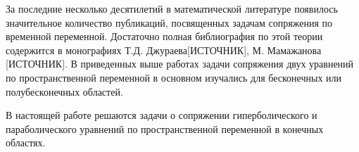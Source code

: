 За последние несколько десятилетий в математической литературе появилось значительное количество публикаций, посвященных задачам сопряжения по временной переменной. Достаточно полная библиография по этой теории содержится в монографиях Т.Д. Джураева[ИСТОЧНИК], М. Мамажанова [ИСТОЧНИК]. В приведенных выше работах задачи сопряжения двух уравнений по пространственной переменной в основном изучались для бесконечных или полубесконечных областей.

В настоящей работе решаются задачи о сопряжении гиперболического и параболического уравнений по пространственной переменной в конечных областях.

\newpage
